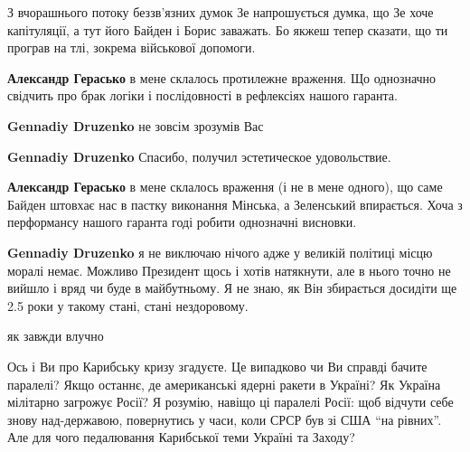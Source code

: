  
 
 
 
 
\zzSecCmt

\begin{itemize} %

З вчорашнього потоку беззв'язних думок Зе напрошується думка, що Зе хоче
капітуляції, а тут його Байден і Борис заважать. Бо якжеш тепер сказати, що ти
програв на тлі, зокрема військової допомоги.

\begin{itemize} %
\textbf{Александр Герасько} в мене склалось протилежне враження. Що однозначно свідчить про брак логіки і послідовності в рефлексіях нашого гаранта.

\textbf{Gennadiy Druzenko} не зовсім зрозумів Вас

\textbf{Gennadiy Druzenko} Спасибо, получил эстетическое удовольствие.

\textbf{Александр Герасько} в мене склалось враження (і не в мене одного), що саме Байден штовхає нас в пастку виконання Мінська, а Зеленський впирається. Хоча з перформансу нашого гаранта годі робити однозначні висновки.

\textbf{Gennadiy Druzenko} я не виключаю нічого адже у великій політиці місцю моралі немає. Можливо Президент щось і хотів натякнути, але в нього точно не вийшло і вряд чи буде в майбутньому. Я не знаю, як Він збирається досидіти ще 2.5 роки у такому стані, стані нездоровому.
\end{itemize} %

як завжди влучно


Ось і Ви про Карибську кризу згадуєте. Це випадково чи Ви справді бачите
паралелі? Якщо останнє, де американські ядерні ракети в Україні? Як Україна
мілітарно загрожує Росії? Я розумію, навіщо ці паралелі Росії: щоб відчути себе
знову над-державою, повернутись у часи, коли СРСР був зі США \enquote{на рівних}. Але
для чого педалювання Карибської теми Україні та Заходу?


\end{itemize}
